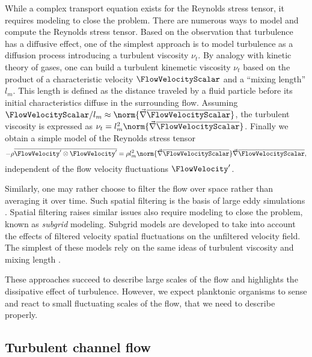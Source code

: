 While a complex transport equation exists for the Reynolds stress tensor, it requires modeling to close the problem.
There are numerous ways to model and compute the Reynolds stress tensor.
Based on the observation that turbulence has a diffusive effect, one of the simplest approach is to model turbulence as a diffusion process introducing a turbulent viscosity $\nu_t$.
By analogy with kinetic theory of gases, one can build a turbulent kinemetic viscosity $\nu_t$ based on the product of a characteristic velocity $\FlowVelocityScalar$ and a ``mixing length'' $l_m$.
This length is defined as the distance traveled by a fluid particle before its initial characteristics diffuse in the surrounding flow. 
Assuming $\FlowVelocityScalar/l_m \approx \norm{\vec{\nabla} \overline{\FlowVelocityScalar}}$, the turbulent viscosity is expressed as $\nu_t = l_m^2 \norm{\vec{\nabla} \overline{\FlowVelocityScalar}}$.
Finally we obtain a simple model of the Reynolds stress tensor
\begin{equation}\label{eq:rans}
		-\rho \overline{\FlowVelocity' \otimes \FlowVelocity'} = \rho l_m^2 \norm{\vec{\nabla} \overline{\FlowVelocityScalar}} \vec{\nabla} \overline{\FlowVelocityScalar},
\end{equation} 
independent of the flow velocity fluctuations $\FlowVelocity'$.

Similarly, one may rather choose to filter the flow over space rather than averaging it over time.
Such spatial filtering is the basis of large eddy simulations \citep{smagorinsky1963general, deardorff1970numerical, zhiyin2015large}.
Spatial filtering raises similar issues also require modeling to close the problem, known as \textit{subgrid} modeling.
Subgrid models are developed to take into account the effects of filtered velocity spatial fluctuations on the unfiltered velocity field.
The simplest of these models rely on the same ideas of turbulent viscosity and mixing length \citep{smagorinsky1963general}.

These approaches succeed to describe large scales of the flow and highlights the dissipative effect of turbulence.
However, we expect planktonic organisms to sense and react to small fluctuating scales of the flow, that we need to describe properly.


\subsection{Turbulent channel flow}\label{sec:num_channel_flow}

